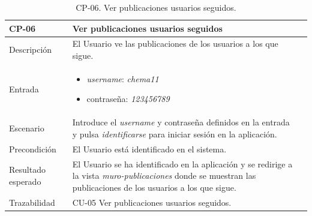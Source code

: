 \begin{table}[H]
    \centering
    \begin{tabularx}{1\textwidth} { 
        | >{\raggedright\arraybackslash}X 
        | >{\raggedright\arraybackslash}X 
        | >{\raggedright\arraybackslash}X
        |  }
    \hline
    \textbf{CP-06}     & \textbf{Ver publicaciones usuarios seguidos}                             \\ \hline
    Descripción        & El Usuario ve las publicaciones de los usuarios a los que sigue.      \\ \hline
    Entrada            & \begin{itemize}
        \item \textit{username}: \textit{chema11}
        \item contraseña: \textit{123456789}
    \end{itemize}  \\ \hline
    Escenario          & Introduce el \textit{username} y contraseña definidos en la entrada y pulsa \textit{identificarse} para iniciar sesión en la aplicación.                           \\ \hline
    Precondición          & El Usuario está identificado en el sistema.                             \\ \hline
   
    Resultado esperado & El Usuario se ha identificado en la aplicación y se redirige a la vista \textit{muro-publicaciones} donde se muestran las publicaciones de los usuarios a los que sigue. \\ \hline
    Trazabilidad & CU-05 Ver publicaciones usuarios seguidos. \\ \hline
\end{tabularx}
\caption{CP-06. Ver publicaciones usuarios seguidos.}
\label{table:CP-06}
    \end{table}


